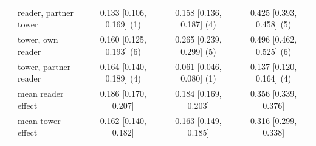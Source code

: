 \begin{table}[htbp]
{\begin{tabular}{llccc}
 & reader, partner tower & 0.133 [0.106, 0.169] (1) & 0.158 [0.136, 0.187] (4) & 0.425 [0.393, 0.458] (5) \\
 & tower, own reader & 0.160 [0.125, 0.193] (6) & 0.265 [0.239, 0.299] (5) & 0.496 [0.462, 0.525] (6) \\
 & tower, partner reader & 0.164 [0.140, 0.189] (4) & 0.061 [0.046, 0.080] (1) & 0.137 [0.120, 0.164] (4) \\
 & \quad mean reader effect & 0.186 [0.170, 0.207] & 0.184 [0.169, 0.203] & 0.356 [0.339, 0.376] \\
 & \quad mean tower effect & 0.162 [0.140, 0.182] & 0.163 [0.149, 0.185] & 0.316 [0.299, 0.338] \\
\bottomrule
\end{tabular}}
\end{table}
